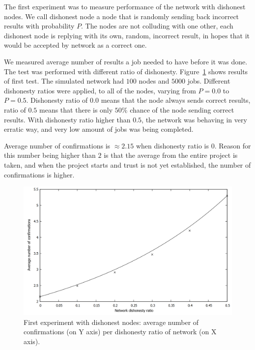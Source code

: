 The first experiment was to measure performance of the network with dishonest nodes. We call dishonest node a node that is randomly sending back incorrect results with probability $P$. The nodes are not colluding with one other, each dishonest node is replying with its own, random, incorrect result, in hopes that it would be accepted by network as a correct one.

We measured average number of results a job needed to have before it was done. The test was performed with different ratio of dishonesty. Figure~\ref{f:confirmations1} shows results of first test. The simulated network had $100$ nodes and $5000$ jobs. Different dishonesty ratios were applied, to all of the nodes, varying from $P = 0.0$ to $P = 0.5$. Dishonesty ratio of $0.0$ means that the node always sends correct results, ratio of $0.5$ means that there is only $50\%$ chance of the node sending correct results. With dishonesty ratio higher than $0.5$, the network was behaving in very erratic way, and very low amount of jobs was being completed.

Average number of confirmations is $\approx 2.15$ when dishonesty ratio is $0$. Reason for this number being higher than $2$ is that the average from the entire project is taken, and when the project starts and trust is not yet established, the number of confirmations is higher.

\begin{figure}
\centering
\includegraphics[width=\textwidth]{diagrams/confirmations.png}
\caption{First experiment with dishonest nodes: average number of confirmations (on Y axis) per dishonesty ratio of network (on X axis).}
\label{f:confirmations1}
\end{figure}

